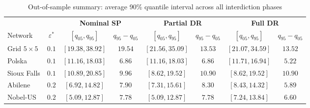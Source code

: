 \begin{table}[htbp]
\centering
\caption{Out-of-sample summary: average 90\% quantile interval across all interdiction phases}
\label{tab:oos-summary}
\small
\setlength{\tabcolsep}{6pt}
\begin{tabular}{l c cc cc cc}
\toprule
& & \multicolumn{2}{c}{\textbf{Nominal SP}} & \multicolumn{2}{c}{\textbf{Partial DR}} & \multicolumn{2}{c}{\textbf{Full DR}} \\
\cmidrule(lr){3-4} \cmidrule(lr){5-6} \cmidrule(lr){7-8}
Network & $\varepsilon^{*}$ & $[q_{05}, q_{95}]$ & $q_{95} \!-\! q_{05}$ & $[q_{05}, q_{95}]$ & $q_{95} \!-\! q_{05}$ & $[q_{05}, q_{95}]$ & $q_{95} \!-\! q_{05}$ \\
\midrule
Grid $5 \times 5$ & $0.1$ & $[19.38, 38.92]$ & $19.54$ & $[21.56, 35.09]$ & $13.53$ & $[21.07, \mathbf{34.59}]$ & $\mathbf{13.52}$ \\
Polska & $0.1$ & $[11.16, 18.03]$ & $6.86$ & $[11.16, 18.03]$ & $6.86$ & $[11.71, \mathbf{16.94}]$ & $\mathbf{5.22}$ \\
Sioux Falls & $0.1$ & $[10.89, 20.85]$ & $\mathbf{9.96}$ & $[8.62, \mathbf{19.52}]$ & $10.90$ & $[8.62, \mathbf{19.52}]$ & $10.90$ \\
Abilene & $0.2$ & $[6.92, 14.82]$ & $7.90$ & $[7.31, 15.61]$ & $8.30$ & $[8.43, \mathbf{14.32}]$ & $\mathbf{5.89}$ \\
Nobel-US & $0.2$ & $[5.09, \mathbf{12.87}]$ & $7.78$ & $[5.09, \mathbf{12.87}]$ & $7.78$ & $[7.24, 13.84]$ & $\mathbf{6.60}$ \\
\bottomrule
\end{tabular}
\end{table}
